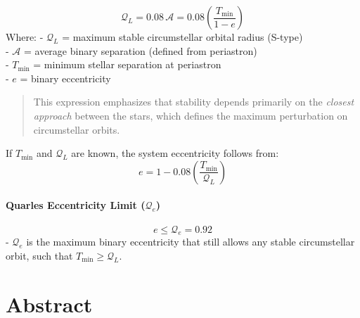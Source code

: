 \documentclass[
  letterpaper,
]{book}
\begin{document}
\[
\mathcal{Q}_L = 0.08\,\mathcal{A}
             = 0.08\!\left(\frac{T_{\min}}{1 - e}\right)
\] Where: - \(\mathcal{Q}_L\) = maximum stable circumstellar orbital
radius (S-type)\\
- \(\mathcal{A}\) = average binary separation (defined from
periastron)\\
- \(T_{\min}\) = minimum stellar separation at periastron\\
- \(e\) = binary eccentricity

\begin{quote}
This expression emphasizes that stability depends primarily on the
\emph{closest approach} between the stars, which defines the maximum
perturbation on circumstellar orbits.
\end{quote}

If \(T_{\min}\) and \(\mathcal{Q}_L\) are known, the system eccentricity
follows from: \[
e = 1 - 0.08\!\left(\frac{T_{\min}}{\mathcal{Q}_L}\right)
\]

\subsubsection{\texorpdfstring{Quarles Eccentricity Limit
(\(\mathcal{Q}_e\))}{Quarles Eccentricity Limit (\textbackslash mathcal\{Q\}\_e)}}\label{quarles-eccentricity-limit-mathcalq_e}

\[
e \le \mathcal{Q}_e = 0.92
\] - \(\mathcal{Q}_e\) is the maximum binary eccentricity that still
allows any stable circumstellar orbit, such that
\(T_{\min} \geq \mathcal{Q}_L\).

\chapter{Abstract}\label{abstract-45}
\end{document}
